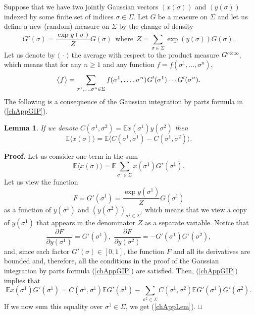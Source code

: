 \documentclass[12pt]{article}
\newcommand{\smsp}{\hspace{0.3mm}}
\newcommand{\e}{\mathbb{E}}
\newcommand{\la}{\langle}
\newcommand{\ra}{\rangle}
\newcommand\qed{\hfill\hbox{\rlap{$\sqcap$}$\sqcup$}}
\newtheorem{lemma}{Lemma}
\theoremstyle{nonumberplain}
\begin{document}
Suppose that we have two jointly Gaussian vectors $(x(\sigma))$ and $(y(\sigma))$ indexed by some finite set of indices $\sigma \in \Sigma$. Let $G$ be a measure on $\Sigma$ and let us define a new (random) measure on $\Sigma$ by the change of density
\begin{equation}
G'(\sigma) = \frac{ \exp y(\sigma) }{Z}G(\sigma)
\,\mbox{ where }\,
Z = \sum_{\sigma\in\Sigma} \exp(y(\sigma)) G(\sigma).
\label{chAppGprimeZ}
\end{equation}
Let us denote by $\la\,\cdot\,\ra$ the average with respect to the product measure $G^{\prime\smsp \otimes \infty}$, which means that for any $n\geq 1$ and any function $f=f(\sigma^1,\ldots, \sigma^n)$,
\begin{equation}
\bigl\la f \bigr\ra = \sum_{\sigma^1,\ldots,\sigma^n \in\Sigma } f(\sigma^1,\ldots, \sigma^n)\smsp
G'(\sigma^1) \cdots G'(\sigma^n).
\label{chAppGprimeave}
\end{equation}
The following is a consequence of the Gaussian integration by parts formula in (\ref{chAppGIP}).
\begin{lemma}\label{chAppLemma1}
If we denote $C(\sigma^1,\sigma^2) = \e x(\sigma^1) y(\sigma^2)$ then
\begin{equation}
\e\bigl\la x(\sigma) \bigr\ra = \e \bigl\la C(\sigma^1,\sigma^1) - C(\sigma^1,\sigma^2)\big\ra.
\label{chAppLem}
\end{equation}
\end{lemma}
\noindent\textbf{Proof.}
Let us consider one term in the sum
$$
\e\bigl\la x(\sigma) \bigr\ra
=
\e \sum_{\sigma^1\in\Sigma}  x(\sigma^1) G'(\sigma^1).
$$
Let us view the function
$$
F = G'(\sigma^1) = \frac{\exp y(\sigma^1)}{Z} G(\sigma^1)
$$ 
as a function of $y(\sigma^1)$ and $(y(\sigma^2))_{\sigma^2\in\Sigma}$, which means that we view a copy of $y(\sigma^1)$ that appears in the denominator $Z$ as a separate variable. Notice that
$$
\frac{\partial F}{\partial y(\sigma^1)} =G'(\sigma^1),\,\,
\frac{\partial F}{\partial y(\sigma^2)}
=
-G'(\sigma^1) G'(\sigma^2),
$$
and, since each factor $G'(\sigma) \in [0,1]$, the function $F$ and all its derivatives are bounded and, therefore, all the conditions in the proof of the Gaussian integration by parts formula  (\ref{chAppGIP}) are satisfied. Then, (\ref{chAppGIP}) implies that
$$
\e x(\sigma^1) G'(\sigma^1)
=
C(\sigma^1,\sigma^1) \e G'(\sigma^1) 
-
\sum_{\sigma^2\in\Sigma} C(\sigma^1,\sigma^2) 
\e G'(\sigma^1) G'(\sigma^2).
$$
If we now sum this equality over $\sigma^1\in\Sigma$, we get (\ref{chAppLem}).
\qed
\end{document}
